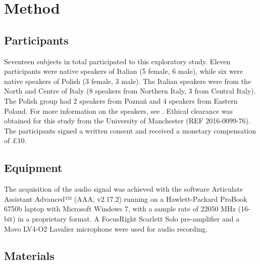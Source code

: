 \documentclass[preprint]{JASAnew}
\begin{document}
\hypertarget{method}{%
\section{Method}\label{method}}

\label{s:method}

\hypertarget{participants}{%
\subsection{Participants}\label{participants}}

Seventeen subjects in total participated to this exploratory study.
Eleven participants were native speakers of Italian (5 female, 6 male),
while six were native speakers of Polish (3 female, 3 male). The Italian
speakers were from the North and Centre of Italy (8 speakers from
Northern Italy, 3 from Central Italy). The Polish group had 2 speakers
from Poznań and 4 speakers from Eastern Poland. For more information on
the speakers, see . Ethical clearance was obtained for
this study from the University of Manchester (REF 2016-0099-76). The
participants signed a written consent and received a monetary
compensation of £10.

\hypertarget{equipment}{%
\subsection{Equipment}\label{equipment}}

The acquisition of the audio signal was achieved with the software
Articulate Assistant Advanced™ (AAA, v2.17.2) running on a
Hawlett-Packard ProBook 6750b laptop with Microsoft Windows 7, with a
sample rate of 22050 MHz (16-bit) in a proprietary format. A FocusRight
Scarlett Solo pre-amplifier and a Movo LV4-O2 Lavalier microphone were
used for audio recording.

\hypertarget{materials}{%
\subsection{Materials}\label{materials}}

\label{s:materials}
\end{document}
